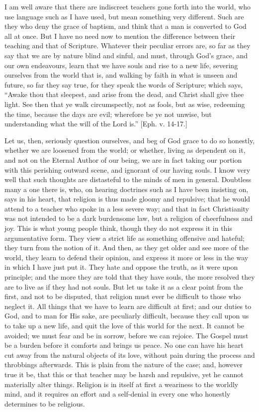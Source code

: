 I am well aware that there are indiscreet teachers
gone forth into the world, who use language such as I
have used, but mean something very different. Such are
they who deny the grace of baptism, and think that a man
is converted to God all at once. But I have no need now
to mention the difference between their teaching and that
of Scripture. Whatever their peculiar errors are, so far
as they say that we are by nature blind and sinful, and
must, through God's grace, and our own endeavours, learn
that we have souls and rise to a new life, severing
ourselves from the world that is, and walking by faith in
what is unseen and future, so far they say true, for they
speak the words of Scripture; which says, ``Awake
thou that sleepest, and arise from the dead, and Christ
shall give thee light. See then that ye walk
circumspectly, not as fools, but as wise, redeeming the
time, because the days are evil; wherefore be ye not
unwise, but understanding what the will of the Lord
is.'' [Eph. v. 14-17.]

Let us, then, seriously question ourselves, and beg of
God grace to do so honestly, whether we are loosened from
the world; or whether, living as dependent on it, and not
on the Eternal Author of our being, we are in fact taking
our portion with this perishing outward scene, and
ignorant of our having souls. I know very well that such
thoughts are distasteful to the minds of men in general.
Doubtless many a one there is, who, on hearing doctrines
such as I have been insisting on, says in his heart, that
religion is thus made gloomy and repulsive; that he would
attend to a teacher who spoke in a less severe way; and
that in fact Christianity was not intended to be a dark
burdensome law, but a religion of cheerfulness and joy.
This is what young people think, though they do not
express it in this argumentative form. They view a strict
life as something offensive and hateful; they turn from
the notion of it. And then, as they get older and see
more of the world, they learn to defend their opinion,
and express it more or less in the way in which I have
just put it. They hate and oppose the truth, as it were
upon principle; and the more they are told that they have
souls, the more resolved they are to live as if they had
not souls. But let us take it as a clear point from the
first, and not to be disputed, that religion must ever be
difficult to those who neglect it. All things that we
have to learn are difficult at first; and our duties to
God, and to man for His sake, are peculiarly difficult,
because they call upon us to take up a new life, and quit
the love of this world for the next. It cannot be
avoided; we must fear and be in sorrow, before we can
rejoice. The Gospel must be a burden before it comforts
and brings us peace. No one can have his heart cut away
from the natural objects of its love, without pain during
the process and throbbings afterwards. This is plain from
the nature of the case; and, however true it be, that
this or that teacher may be harsh and repulsive, yet he
cannot materially alter things. Religion is in itself at
first a weariness to the worldly mind, and it requires an
effort and a self-denial in every one who honestly
determines to be religious.

